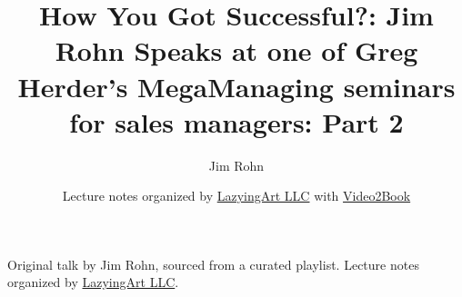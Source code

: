 \documentclass[11pt,oneside]{book}
\begin{document}
\frontmatter
\title{How You Got Successful?: Jim Rohn Speaks at one of Greg Herder's MegaManaging seminars for sales managers: Part 2}
\author{Jim Rohn}
\date{Lecture notes organized by \href{https://lazying.art}{LazyingArt LLC} with \href{https://github.com/lachlanchen/Video2Book}{Video2Book}}
\maketitle
\begin{center}
\small Original talk by Jim Rohn, sourced from a curated playlist. Lecture notes organized by \href{https://lazying.art}{LazyingArt LLC}.
\end{center}
\clearpage
\mainmatter

\end{document}

